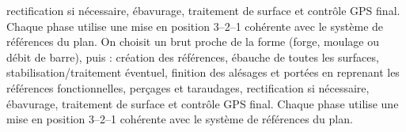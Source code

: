 \begin{corrigebox}
                rectification si nécessaire, ébavurage, traitement de surface et contrôle
                GPS final. Chaque phase utilise une mise en position 3--2--1 cohérente avec
                le système de références du plan.
On choisit un brut proche de la forme (forge, moulage ou
                débit de barre), puis : création des références, ébauche de toutes les
                surfaces, stabilisation/traitement éventuel, finition des alésages et
                portées en reprenant les références fonctionnelles, perçages et taraudages,
                rectification si nécessaire, ébavurage, traitement de surface et contrôle
                GPS final. Chaque phase utilise une mise en position 3--2--1 cohérente avec
                le système de références du plan.
\end{corrigebox}
